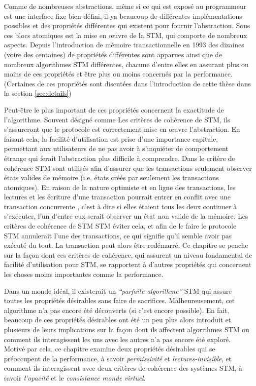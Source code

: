 Comme de nombreuses abstractions, même si ce qui est exposé au programmeur est une interface fixe bien défini,
il ya beaucoup de différentes implémentations possibles et des propriétés différentes qui existent pour fournir l'abstraction.
Sous ces blocs atomiques est la mise en œuvre de la STM, qui comporte de nombreux aspects.
Depuis l'introduction de mémoire transactionnelle en 1993 \cite{HM93} des dizaines (voire des centaines) de propriétés différentes
sont apparues ainsi que de nombreux algorithmes STM différentes, chacune d'entre elles en assurant plus ou moins de ces propriétés et être plus ou moins concernés par la performance.
(Certaines de ces propriétés sont discutées dans l'introduction de cette thèse dans la section \ref{sec:details})


Peut-être le plus important de ces propriétés concernent la exactitude de l'algorithme.
Souvent désigné comme Les critères de cohérence de STM, ils s'assureront que le protocole est correctement mise en œuvre l'abstraction.
En faisant cela, la facilité d'utilisation est prise d'une importance capitale,
permettant aux utilisateurs de ne pas avoir à s'inquiéter de comportement étrange qui ferait l'abstraction plus difficile à comprendre.
Dans le critère de cohérence STM sont utilisés afin d'assurer que les transactions seulement observer états
valides de mémoire (i.e. états créés par seulement les transactions atomiques).
En raison de la nature optimiste et en ligne des transactions, les lectures et les écriture d'une transaction pourrait entrer en conflit
avec une transaction concurrente , c'est à dire si elles étaient tous les deux continuer à s'exécuter, l'un d'entre eux serait observer un état non valide de la mémoire.
Les critères de cohérence de STM STM éviter cela, et afin de le faire le protocole STM annulerait l'une des transactions, ce qui signifie qu'il semble avoir pas exécuté du tout.
La transaction peut alors être redémarré.
Ce chapitre se penche sur la façon dont ces critères de cohérence, qui assurent un niveau fondamental de facilité d'utilisation pour STM,
se rapportent à d'autres propriétés qui concernent les choses moins importantes comme la performance.


Dans un monde idéal, il existerait un \emph{``parfaite algorithme''} STM qui assure toutes les propriétés désirables sans faire de sacrifices.
Malheureusement, cet algorithme n'a pas encore été découverts (si c'est encore possible).
En fait, beaucoup de ces propriétés désirables ont été un peu plus alors introduit et plusieurs de leurs implications sur la façon
dont ils affectent algorithmes STM ou comment ils interagissent les uns avec les autres n'a pas encore été exploré.
Motivé par cela, ce chapitre examine deux propriétés désirables qui se préoccupent de la performance,
à savoir \emph{permissivité} et \emph{lectures-invisible}, et comment ils interagissent avec deux critères de cohérence des systèmes STM,
à savoir \emph{l'opacité} et le \emph{consistance monde virtuel}.



